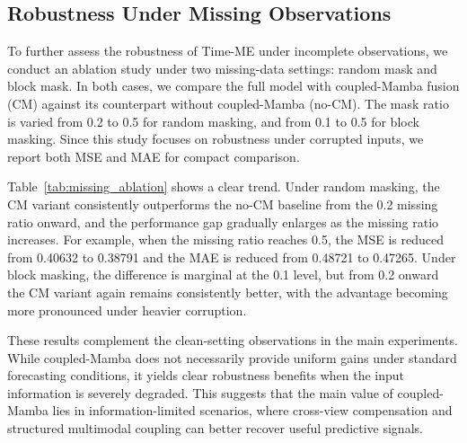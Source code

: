 \subsection{Robustness Under Missing Observations}

To further assess the robustness of Time-ME under incomplete observations, we conduct an ablation study under two missing-data settings: random mask and block mask. In both cases, we compare the full model with coupled-Mamba fusion (CM) against its counterpart without coupled-Mamba (no-CM). The mask ratio is varied from 0.2 to 0.5 for random masking, and from 0.1 to 0.5 for block masking. Since this study focuses on robustness under corrupted inputs, we report both MSE and MAE for compact comparison.

Table~\ref{tab:missing_ablation} shows a clear trend. Under random masking, the CM variant consistently outperforms the no-CM baseline from the 0.2 missing ratio onward, and the performance gap gradually enlarges as the missing ratio increases. For example, when the missing ratio reaches 0.5, the MSE is reduced from 0.40632 to 0.38791 and the MAE is reduced from 0.48721 to 0.47265. Under block masking, the difference is marginal at the 0.1 level, but from 0.2 onward the CM variant again remains consistently better, with the advantage becoming more pronounced under heavier corruption.

These results complement the clean-setting observations in the main experiments. While coupled-Mamba does not necessarily provide uniform gains under standard forecasting conditions, it yields clear robustness benefits when the input information is severely degraded. This suggests that the main value of coupled-Mamba lies in information-limited scenarios, where cross-view compensation and structured multimodal coupling can better recover useful predictive signals.

